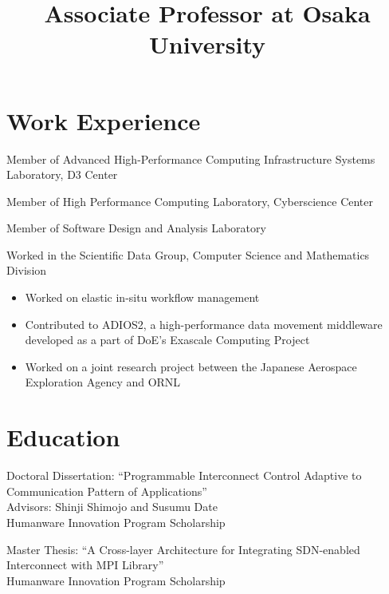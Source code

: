\documentclass[10pt,a4paper,sans]{moderncv}
\title{Associate Professor at Osaka University}
\begin{document}
\makecvtitle

\section{Work Experience}

%
{%
Member of Advanced High-Performance Computing Infrastructure Systems Laboratory, D3 Center
}

%
{%
Member of High Performance Computing Laboratory, Cyberscience Center
}

%
{%
Member of Software Design and Analysis Laboratory
}

%
{%
Worked in the Scientific Data Group, Computer Science and Mathematics Division
\begin{itemize}%
\item Worked on elastic in-situ workflow management
\item Contributed to ADIOS2, a high-performance data movement middleware
    developed as a part of DoE's Exascale Computing Project
\item Worked on a joint research project between the Japanese Aerospace
    Exploration Agency and ORNL
\end{itemize}
}

\section{Education}

%
{Doctoral Dissertation: ``Programmable Interconnect Control Adaptive to Communication Pattern of Applications''\\%
Advisors: Shinji Shimojo and Susumu Date\\%
Humanware Innovation Program Scholarship}

%
{Master Thesis: ``A Cross-layer Architecture for Integrating SDN-enabled
Interconnect with MPI Library''\\%
Humanware Innovation Program Scholarship}
\end{document}
